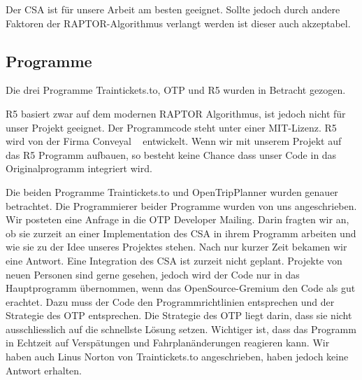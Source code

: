 Der CSA ist für unsere Arbeit am besten geeignet. Sollte jedoch durch andere Faktoren der RAPTOR-Algorithmus verlangt werden ist dieser auch akzeptabel.


\subsection{Programme}
\label{sec:erkenntnisseProgramme}
Die drei Programme Traintickets.to, OTP und R5 wurden in Betracht gezogen. 

R5 basiert zwar auf dem modernen RAPTOR Algorithmus, ist jedoch nicht für unser Projekt geeignet. Der Programmcode steht unter einer MIT-Lizenz. R5 wird von der Firma Conveyal ~\cite{conveyal} entwickelt. Wenn wir mit unserem Projekt auf das R5 Programm aufbauen, so besteht keine Chance dass unser Code in das Originalprogramm integriert wird.

Die beiden Programme Traintickets.to und OpenTripPlanner wurden genauer betrachtet. Die Programmierer beider Programme wurden von uns angeschrieben. Wir posteten eine Anfrage in die OTP Developer Mailing. Darin fragten wir an, ob sie zurzeit an einer Implementation des CSA in ihrem Programm arbeiten und wie sie zu der Idee unseres Projektes stehen. Nach nur kurzer Zeit bekamen wir eine Antwort. Eine Integration des CSA ist zurzeit nicht geplant. Projekte von neuen Personen sind gerne gesehen, jedoch wird der Code nur in das Hauptprogramm übernommen, wenn  das OpenSource-Gremium den Code als gut erachtet. Dazu muss der Code den Programmrichtlinien entsprechen und der Strategie des OTP entsprechen. Die Strategie des OTP liegt darin, dass sie nicht ausschliesslich auf die schnellste Lösung setzen. Wichtiger ist, dass das Programm in Echtzeit auf Verspätungen und Fahrplanänderungen reagieren kann. Wir haben auch Linus Norton von Traintickets.to angeschrieben, haben jedoch keine Antwort erhalten. 

